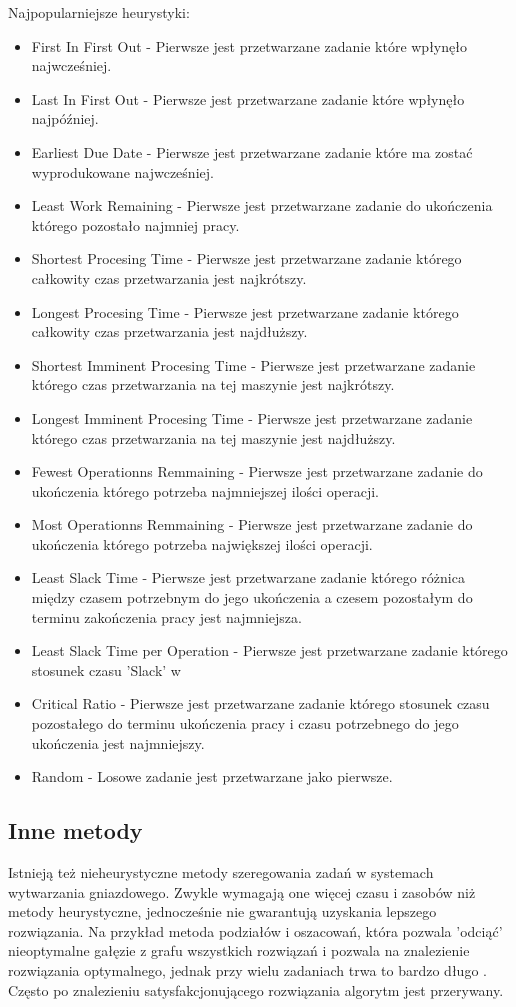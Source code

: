 \documentclass[twoside]{kInzynierka}
\begin{document}
Najpopularniejsze heurystyki\cite{jobSlack}:
\begin{itemize}
\item First In First Out - Pierwsze jest przetwarzane zadanie które wpłynęło najwcześniej.
\item Last In First Out - Pierwsze jest przetwarzane zadanie które wpłynęło najpóźniej.
\item Earliest Due Date - Pierwsze jest przetwarzane zadanie które ma zostać wyprodukowane najwcześniej.
\item Least Work Remaining - Pierwsze jest przetwarzane zadanie do ukończenia którego pozostało najmniej pracy.
\item Shortest Procesing Time - Pierwsze jest przetwarzane zadanie którego całkowity czas przetwarzania jest najkrótszy.
\item Longest Procesing Time - Pierwsze jest przetwarzane zadanie którego całkowity czas przetwarzania jest najdłuższy.
\item Shortest Imminent Procesing Time - Pierwsze jest przetwarzane zadanie którego czas przetwarzania na tej maszynie jest najkrótszy.
\item Longest Imminent Procesing Time - Pierwsze jest przetwarzane zadanie którego czas przetwarzania na tej maszynie jest najdłuższy.
\item Fewest Operationns Remmaining - Pierwsze jest przetwarzane zadanie do ukończenia którego potrzeba najmniejszej ilości operacji.
\item Most Operationns Remmaining - Pierwsze jest przetwarzane zadanie do ukończenia którego potrzeba największej ilości operacji.
\item Least Slack Time - Pierwsze jest przetwarzane zadanie którego różnica między czasem potrzebnym do jego ukończenia a czesem pozostałym do terminu zakończenia pracy jest najmniejsza.
\item Least Slack Time per Operation - Pierwsze jest przetwarzane zadanie którego stosunek czasu 'Slack' w
\item Critical Ratio - Pierwsze jest przetwarzane zadanie którego stosunek czasu pozostałego do terminu ukończenia pracy i czasu potrzebnego do jego ukończenia jest najmniejszy.
\item Random - Losowe zadanie jest przetwarzane jako pierwsze.
\end{itemize}

\subsection     {Inne metody}
Istnieją też nieheurystyczne metody szeregowania zadań w systemach wytwarzania gniazdowego. Zwykle wymagają one więcej czasu i zasobów niż metody heurystyczne, jednocześnie nie gwarantują uzyskania lepszego rozwiązania. Na przykład metoda podziałów i oszacowań, która pozwala 'odciąć' nieoptymalne gałęzie z grafu wszystkich rozwiązań i pozwala na znalezienie rozwiązania optymalnego, jednak przy wielu zadaniach trwa to bardzo długo \cite{lagrange}. Często po znalezieniu satysfakcjonującego rozwiązania algorytm jest przerywany.
\end{document}
